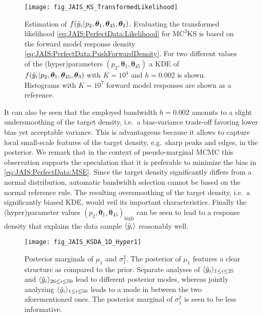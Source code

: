 \begin{figure}[htbp]
  \centering
  \texttt{[image: fig\_JAIS\_KS\_TransformedLikelihood]}
  \caption[Estimation of \(f(\perfect{y}_i \cond p_2,\bm{\theta}_1,\bm{\theta}_{45},\bm{\theta}_3)\)]{Estimation of \(f(\perfect{y}_i \cond p_2,\bm{\theta}_1,\bm{\theta}_{45},\bm{\theta}_3)\).
           Evaluating the transformed likelihood \cref{eq:JAIS:PerfectData:Likelihood} for \(\text{MC}^3\text{KS}\)
           is based on the forward model response density \cref{eq:JAIS:PerfectData:PushForwardDensity}.
           For two different values of the (hyper)parameters \((p_2,\bm{\theta}_1,\bm{\theta}_{45})\) a KDE of 
           \(f(\perfect{y}_i \cond p_2,\bm{\theta}_1,\bm{\theta}_{45},\bm{\theta}_3)\) with \(K=10^4\) and \(h=0.002\) is shown.
           Histograms with \(K=10^7\) forward model responses are shown as a reference.
          }
  \label{pre:JAIS:TransformedLikelihood}
\end{figure}
\par %
It can also be seen that the employed bandwidth \(h=0.002\) amounts to a slight undersmoothing of the target density, i.e.\ a bias-variance trade-off favoring lower bias yet acceptable variance.
This is advantageous because it allows to capture local small-scale features of the target density, e.g.\ sharp peaks and edges, in the posterior.
We remark that in the context of pseudo-marginal MCMC \cite{MCMC:Andrieu2009} this observation supports the speculation that it is preferable to minimize the bias in \cref{eq:JAIS:PerfectData:MSE}.
Since the target density significantly differs from a normal distribution, automatic bandwidth selection cannot be based on the normal reference rule.
The resulting oversmoothing of the target density, i.e.\ a significantly biased KDE, would veil its important characteristics.
Finally the (hyper)parameter values \((p_2,\bm{\theta}_1,\bm{\theta}_{45})_{\mathrm{high}}\) can be seen to lead to a response density that explains the data sample \(\langle{\tilde{y}_i}\rangle\) reasonably well.
\begin{figure}[p]
  \centering
  \texttt{[image: fig\_JAIS\_KSDA\_1D\_Hyper1]}
  \caption[Posterior marginals of \(\mu_1\) and \(\sigma^2_1\)]{Posterior marginals of \(\mu_1\) and \(\sigma^2_1\).
           The posterior of \(\mu_1\) features a clear structure as compared to the prior.
           Separate analyses of \(\langle{\tilde{y}_i}\rangle_{1 \leq i \leq 25}\) and \(\langle{\tilde{y}_i}\rangle_{26 \leq i \leq 50}\) lead to different posterior modes,
           whereas jointly analyzing \(\langle{\tilde{y}_i}\rangle_{1 \leq i \leq 50}\) leads to a mode in between the two aforementioned ones.
           The posterior marginal of \(\sigma^2_1\) is seen to be less informative.
          }
  \label{res:JAIS:Hyper1}
\end{figure}
